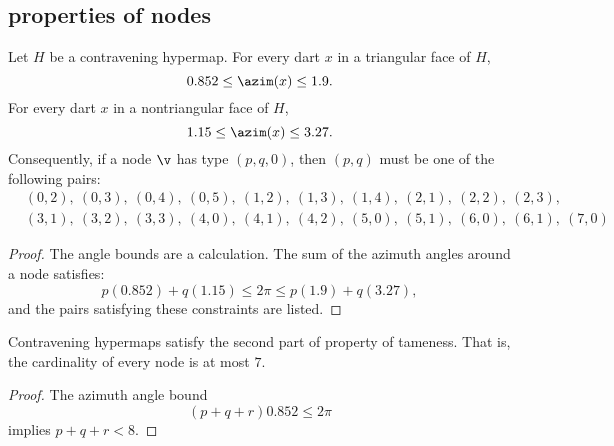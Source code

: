 \subsection{properties of nodes}
%



\begin{lemma}[] \label{lemma:0.852}
Let $H$ be a contravening
hypermap. For every dart $x$ in a triangular face of $H$,
\begin{displaymath}0.852\le \azim(x)\le 1.9.\end{displaymath}
For every dart $x$ in a nontriangular face of $H$, 
\begin{displaymath}1.15\le\azim(x)\le 3.27.\end{displaymath}
%
%
Consequently, if a node $\v$ has type $(p,q,0)$, then $(p,q)$
must be one of the following pairs:
\begin{displaymath}
\begin{array}{lll}
  &(0,2),~(0,3),~(0,4),~(0,5),~(1,2),~(1,3),~(1,4),~(2,1),~(2,2),~(2,3),\\
  &(3,1),~(3,2),~(3,3),~(4,0),~(4,1),~(4,2),
  ~(5,0),~(5,1),~(6,0),~(6,1),~(7,0)
\end{array}
\end{displaymath}
\end{lemma}
%

\begin{proof}
The angle bounds are a calculation.  The sum of the azimuth angles
around a node satisfies:
\begin{displaymath}
p (0.852) + q (1.15) \le 2\pi \le p (1.9) + q (3.27),
\end{displaymath}
and the pairs satisfying these constraints are listed.
\end{proof}

\begin{lemma}[]\label{lemma:node-upper}
Contravening hypermaps satisfy the second part of property 
of tameness.  That is, the cardinality of every
node is at most $7$.
\end{lemma}

\begin{proof}  The azimuth angle bound
\begin{displaymath}
(p+q+r) 0.852 \le 2\pi
\end{displaymath}
implies $p+q+r < 8$.
\end{proof}




